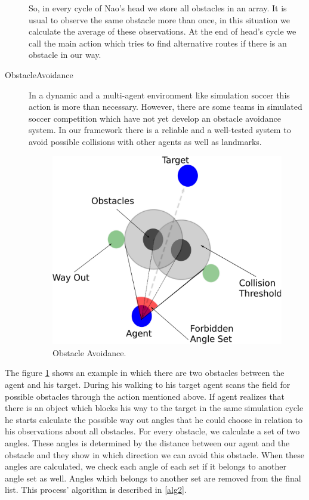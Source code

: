 \begin{description}
 So, in every cycle of Nao's head we store all obstacles in an array. It is usual to observe the same obstacle more than once, in this situation we calculate the average of these observations. At the end of head's cycle we call the main action which tries to find alternative routes if there is an obstacle in our way.
 \item[ObstacleAvoidance]
 In a dynamic and a multi-agent environment like simulation soccer this action is more than necessary. However, there are some teams in simulated soccer competition which have not yet develop an obstacle avoidance system. In our framework there is a
 reliable and a well-tested system to avoid possible collisions with other agents as well as landmarks.
  \begin{figure}[!h]
\centering
  \includegraphics[scale=0.6]{Chapter3/figures/ObstacleAvoidance.pdf}
  \caption{Obstacle Avoidance.}
  \label{fig:ObstacleAvoidance}
\end{figure} 
\end{description}
The figure \ref{fig:ObstacleAvoidance} shows an example in which there are two obstacles between the agent and his target. During his walking to his target agent scans the field for possible obstacles through the action mentioned above. If agent realizes that there is an object which blocks his way to the target in the same simulation cycle he starts calculate the possible way out angles that he could choose in relation to his observations about all obstacles. For every obstacle, we calculate a set of two angles. These angles is determined by the distance between our agent and the obstacle and they show in which direction we can avoid this obstacle. When these angles are calculated, we check each angle of each set if it belongs to another angle set as well. Angles which belongs to another set are removed from the final list. This process' algorithm is described in \ref{alg2}.
